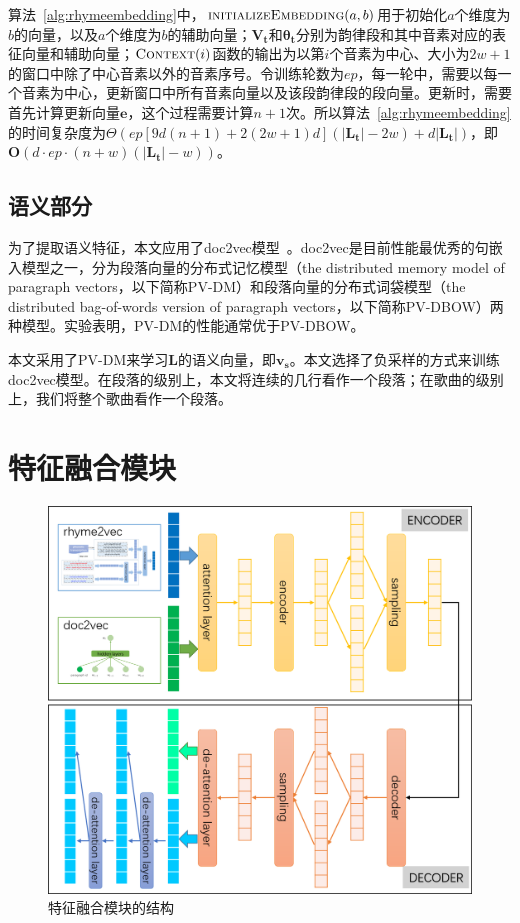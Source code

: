 算法~\ref{alg:rhymeembedding}中，$\Call{initializeEmbedding}{a, b}$用于初始化$a$个维度为$b$的向量，以及$a$个维度为$b$的辅助向量；$\bm {V_t}$和$\bm {\theta_t}$分别为韵律段和其中音素对应的表征向量和辅助向量；$\Call{Context}{i}$函数的输出为以第$i$个音素为中心、大小为$2w+1$的窗口中除了中心音素以外的音素序号。令训练轮数为$ep$，每一轮中，需要以每一个音素为中心，更新窗口中所有音素向量以及该段韵律段的段向量。更新时，需要首先计算更新向量$\bm e$，这个过程需要计算$n+1$次。所以算法~\ref{alg:rhymeembedding}的时间复杂度为$\Theta({ep[9d(n + 1) + 2(2w + 1)d](|\bm {L_t}|-2w)}+d|\bm {L_t}|)$，即$\mathrm{\bm O}(d\cdot ep \cdot(n+w)(|\bm {L_t}|-w))$。

\subsection{语义部分}

为了提取语义特征，本文应用了doc2vec模型~\cite{quoc2014distributed}。doc2vec是目前性能最优秀的句嵌入模型之一，分为段落向量的分布式记忆模型（the distributed memory model of paragraph vectors，以下简称PV-DM）和段落向量的分布式词袋模型（the distributed bag-of-words version of paragraph vectors，以下简称PV-DBOW）两种模型。实验表明，PV-DM的性能通常优于PV-DBOW。\par

本文采用了PV-DM来学习$\bm {L}$的语义向量，即$\bm {v_s}$。本文选择了负采样的方式来训练doc2vec模型。在段落的级别上，本文将连续的几行看作一个段落；在歌曲的级别上，我们将整个歌曲看作一个段落。\par

\section{特征融合模块} \label{utm}

\begin{figure}[t]
  \centering
  \includegraphics[width=1\textwidth]{HAVAE.png}
  \caption{特征融合模块的结构}
  \label{fig:aggregation}
\end{figure}

